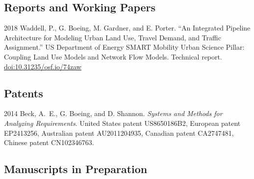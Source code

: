 \documentclass[12pt,letterpaper]{report}
\begin{document}
    \subsection*{Reports and Working Papers}

    \begin{tablist}

        \item[2018] \tab Waddell, P., G. Boeing, M. Gardner, and E. Porter. \enquote{An Integrated Pipeline Architecture for Modeling Urban Land Use, Travel Demand, and Traffic Assignment.} US Department of Energy SMART Mobility Urban Science Pillar: Coupling Land Use Models and Network Flow Models. Technical report. \href{https://doi.org/10.31235/osf.io/74zaw}{doi:10.31235/osf.io/74zaw}

    \end{tablist}



    \subsection*{Patents}

    \begin{tablist}

        \item[2014] \tab Beck, A.~E., G. Boeing, and D. Shannon. \textit{Systems and Methods for Analyzing Requirements}. United States patent US8650186B2, European patent EP2413256, Australian patent AU2011204935, Canadian patent CA2747481, Chinese patent CN102346763.

    \end{tablist}



    \subsection*{Manuscripts in Preparation}
\end{document}
